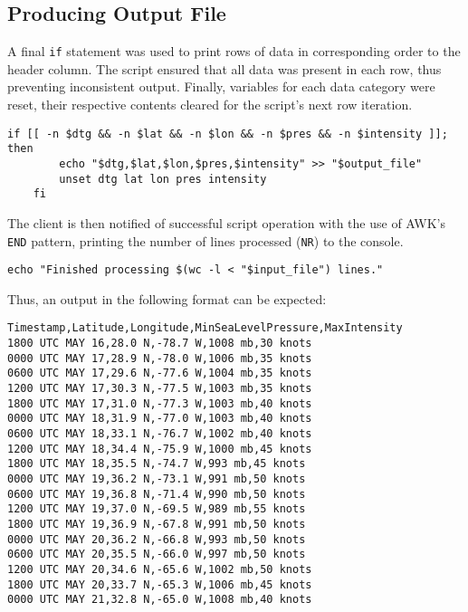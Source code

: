 \documentclass[]{article}
\begin{document}
    \subsection{Producing Output File}
    A final \verb|if| statement was used to print rows of data in corresponding order to the header column. The script ensured that all data was present in each row, thus preventing inconsistent output. Finally, variables for each data category were reset, their respective contents cleared for the script's next row iteration.
    \begin{verbatim}
if [[ -n $dtg && -n $lat && -n $lon && -n $pres && -n $intensity ]]; then
        echo "$dtg,$lat,$lon,$pres,$intensity" >> "$output_file"
        unset dtg lat lon pres intensity
    fi
    \end{verbatim}
    The client is then notified of successful script operation with the use of AWK's \verb|END| pattern, printing the number of lines processed (\verb|NR|) to the console.
    \begin{verbatim}
echo "Finished processing $(wc -l < "$input_file") lines."
    \end{verbatim}
    Thus, an output in the following format can be expected:
    \begin{verbatim}
Timestamp,Latitude,Longitude,MinSeaLevelPressure,MaxIntensity
1800 UTC MAY 16,28.0 N,-78.7 W,1008 mb,30 knots
0000 UTC MAY 17,28.9 N,-78.0 W,1006 mb,35 knots
0600 UTC MAY 17,29.6 N,-77.6 W,1004 mb,35 knots
1200 UTC MAY 17,30.3 N,-77.5 W,1003 mb,35 knots
1800 UTC MAY 17,31.0 N,-77.3 W,1003 mb,40 knots
0000 UTC MAY 18,31.9 N,-77.0 W,1003 mb,40 knots
0600 UTC MAY 18,33.1 N,-76.7 W,1002 mb,40 knots
1200 UTC MAY 18,34.4 N,-75.9 W,1000 mb,45 knots
1800 UTC MAY 18,35.5 N,-74.7 W,993 mb,45 knots
0000 UTC MAY 19,36.2 N,-73.1 W,991 mb,50 knots
0600 UTC MAY 19,36.8 N,-71.4 W,990 mb,50 knots
1200 UTC MAY 19,37.0 N,-69.5 W,989 mb,55 knots
1800 UTC MAY 19,36.9 N,-67.8 W,991 mb,50 knots
0000 UTC MAY 20,36.2 N,-66.8 W,993 mb,50 knots
0600 UTC MAY 20,35.5 N,-66.0 W,997 mb,50 knots
1200 UTC MAY 20,34.6 N,-65.6 W,1002 mb,50 knots
1800 UTC MAY 20,33.7 N,-65.3 W,1006 mb,45 knots
0000 UTC MAY 21,32.8 N,-65.0 W,1008 mb,40 knots
    \end{verbatim}
\end{document}

